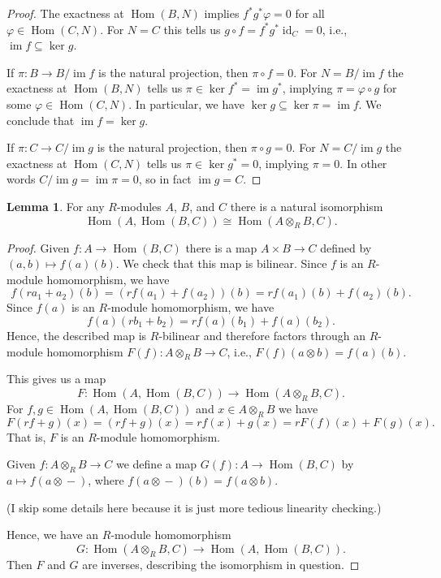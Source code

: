 \documentclass[12pt]{article}
\theoremstyle{definition}
\newtheorem{lemma}{Lemma}
\renewcommand{\phi}{\varphi}
\newcommand{\<}{\langle}
\renewcommand{\>}{\rangle}
\newcommand{\isom}{\cong}
\DeclareMathOperator{\id}{id}
\DeclareMathOperator{\im}{im}
\DeclareMathOperator{\Hom}{Hom}
\DeclareMathOperator{\tensor}{\otimes}
\begin{document}
\begin{proof}
    The exactness at $\Hom(B, N)$ implies $f^*g^*\phi = 0$ for all $\phi \in \Hom(C, N)$.
    For $N = C$ this tells us $g \circ f = f^*g^*\id_C = 0$, i.e., $\im f \subseteq \ker g$.

    If $\pi : B \to B/\im f$ is the natural projection, then $\pi \circ f = 0$. For $N = B/\im f$ the exactness at $\Hom(B, N)$ tells us $\pi \in \ker f^* = \im g^*$, implying $\pi = \phi \circ g$ for some $\phi \in \Hom(C, N)$. In particular, we have $\ker g \subseteq \ker \pi = \im f$. We conclude that $\im f = \ker g$.

    If $\pi : C \to C/\im g$ is the natural projection, then $\pi \circ g = 0$.
    For $N = C/\im g$ the exactness at $\Hom(C, N)$ tells us $\pi \in \ker g^* = 0$, implying $\pi = 0$.
    In other words $C/\im g = \im \pi = 0$, so in fact $\im g = C$.
\end{proof}

\begin{lemma}
    For any $R$-modules $A$, $B$, and $C$ there is a natural isomorphism
    \[
        \Hom(A, \Hom(B, C)) \isom \Hom(A \tensor_R B, C).
    \]
\end{lemma}

\begin{proof}
    Given $f : A \to \Hom(B, C)$ there is a map $A \times B \to C$ defined by $(a, b) \mapsto f(a)(b)$. We check that this map is bilinear. Since $f$ is an $R$-module homomorphism, we have
    \[
        f(ra_1 + a_2)(b) = (rf(a_1) + f(a_2))(b) = rf(a_1)(b) + f(a_2)(b).
    \]
    Since $f(a)$ is an $R$-module homomorphism, we have
    \[
        f(a)(rb_1 + b_2) = rf(a)(b_1) + f(a)(b_2).
    \]
    Hence, the described map is $R$-bilinear and therefore factors through an $R$-module homomorphism $F(f) : A \tensor_R B \to C$, i.e., $F(f)(a \tensor b) = f(a)(b)$.

    This gives us a map
    \[
        F : \Hom(A, \Hom(B, C)) \longrightarrow \Hom(A \tensor_R B, C).
    \]
    For $f, g \in \Hom(A, \Hom(B, C))$ and $x \in A \tensor_R B$ we have
    \[
        F(rf + g)(x)
            = (rf + g)(x) = rf(x) + g(x)
            = rF(f)(x) + F(g)(x).
    \]
    That is, $F$ is an $R$-module homomorphism.

    Given $f : A \tensor_R B \to C$ we define a map $G(f) : A \to \Hom(B, C)$ by $a \mapsto f(a \tensor -)$, where $f(a \tensor -)(b) = f(a \tensor b)$.
    
    (I skip some details here because it is just more tedious linearity checking.)

    Hence, we have an $R$-module homomorphism
    \[
        G : \Hom(A \tensor_R B, C) \longrightarrow \Hom(A, \Hom(B, C)).
    \]
    Then $F$ and $G$ are inverses, describing the isomorphism in question.
\end{proof}
\end{document}
